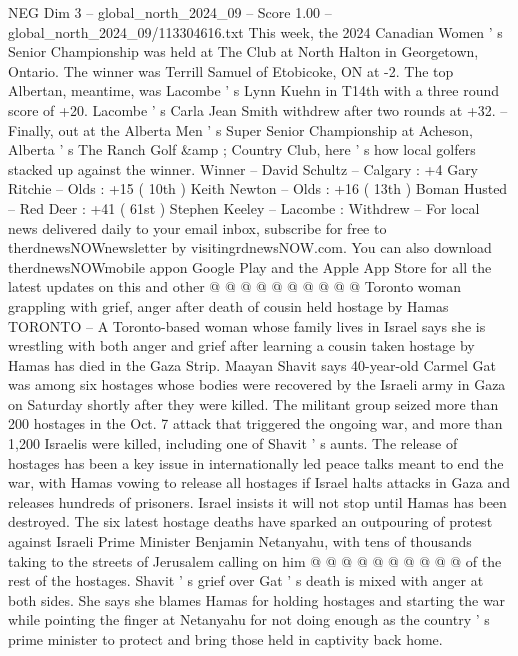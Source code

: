 \begin{textsample}{NEG Dim 3 – global\_north\_2024\_09 – Score 1.00 – global\_north\_2024\_09/113304616.txt}  \label{ex:f3_neg_293}
This week, the 2024 Canadian Women ' s Senior Championship was held at The Club at North Halton in Georgetown, Ontario.
The winner was Terrill Samuel of Etobicoke, ON at -2.
The top Albertan, meantime, was Lacombe ' s Lynn Kuehn in T14th with a three round score of +20.
Lacombe ' s Carla Jean Smith withdrew after two rounds at +32. -- Finally, out at the Alberta Men ' s Super Senior Championship at Acheson, Alberta ' s The Ranch Golf \&amp ; Country Club, here ' s how local golfers stacked up against the winner.
Winner -- David Schultz -- Calgary : +4 Gary Ritchie -- Olds : +15 ( 10th ) Keith Newton -- Olds : +16 ( 13th ) Boman Husted -- Red Deer : +41 ( 61st ) Stephen Keeley -- Lacombe : Withdrew -- For local news delivered daily to your email inbox, subscribe for free to therdnewsNOWnewsletter by visitingrdnewsNOW.com.
You can also download therdnewsNOWmobile appon Google Play and the Apple App Store for all the latest updates on this and other @ @ @ @ @ @ @ @ @ @ Toronto woman grappling with grief, anger after death of cousin held hostage by Hamas TORONTO -- A Toronto-based woman whose family lives in Israel says she is wrestling with both anger and grief after learning a cousin taken hostage by Hamas has died in the Gaza Strip.
Maayan Shavit says 40-year-old Carmel Gat was among six hostages whose bodies were recovered by the Israeli army in Gaza on Saturday shortly after they were killed.
The militant group seized more than 200 hostages in the Oct. 7 attack that triggered the ongoing war, and more than 1,200 Israelis were killed, including one of Shavit ' s aunts.
The release of hostages has been a key issue in internationally led peace talks meant to end the war, with Hamas vowing to release all hostages if Israel halts attacks in Gaza and releases hundreds of prisoners.
Israel insists it will not stop until Hamas has been destroyed.
The six latest hostage deaths have sparked an outpouring of protest against Israeli Prime Minister Benjamin Netanyahu, with tens of thousands taking to the streets of Jerusalem calling on him @ @ @ @ @ @ @ @ @ @ of the rest of the hostages.
Shavit ' s grief over Gat ' s death is mixed with anger at both sides.
She says she blames Hamas for holding hostages and starting the war while pointing the finger at Netanyahu for not doing enough as the country ' s prime minister to protect and bring those held in captivity back home.

\end{textsample}
